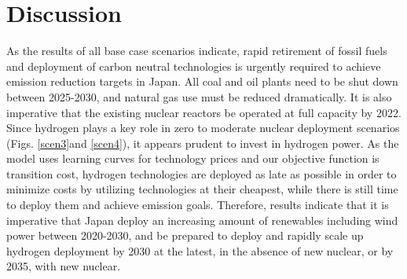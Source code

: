\section{Discussion}


As the results of all base case scenarios indicate, rapid retirement of fossil fuels and deployment of carbon neutral technologies is urgently required to achieve emission reduction targets in Japan. All coal and oil plants need to be shut down between 2025-2030, and natural gas use must be reduced dramatically. It is also imperative that the existing nuclear reactors be operated at full capacity by 2022. Since hydrogen plays a key role in zero to moderate nuclear deployment scenarios (Figs. \ref{scen3}and \ref{scen4}), it appears prudent to invest in hydrogen power. As the model uses learning curves for technology prices and our objective function is transition cost, hydrogen technologies are deployed as late as possible in order to minimize costs by utilizing technologies at their cheapest, while there is still time to deploy them and achieve emission goals. Therefore,  results indicate that it is imperative that Japan deploy an increasing amount of renewables including wind power between 2020-2030, and be prepared to deploy and rapidly scale up hydrogen deployment by 2030 at the latest, in the absence of new nuclear, or by 2035, with new nuclear.

